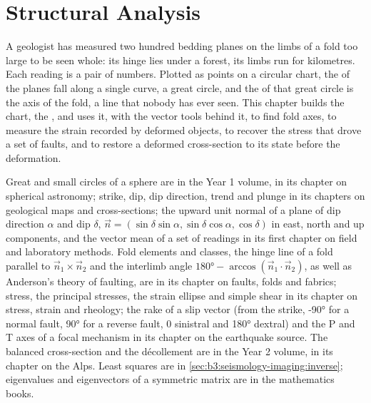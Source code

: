 \chapter{Structural Analysis}\label{ch:b3:structural-analysis}

A geologist has measured two hundred bedding planes on the limbs of a fold
too large to be seen whole: its hinge lies under a forest, its limbs run for
kilometres. Each reading is a pair of numbers. Plotted as points on a circular
chart, the  of the planes fall along a single curve, a great circle, and
the  of that great circle is the axis of the fold, a line that nobody has
ever seen. This chapter builds the chart, the , and
uses it, with the vector tools behind it, to find fold axes, to measure the
strain recorded by deformed objects, to recover the stress that drove a set of
faults, and to restore a deformed cross-section to its state before the
deformation.

\begin{recall}
Great and small circles of a sphere are in the Year 1 volume, in its chapter
on spherical astronomy; strike, dip, dip direction, trend and plunge in its
chapters on geological maps and cross-sections; the upward unit normal of a
plane of dip direction $\alpha$ and dip $\delta$, $\vec n = (\sin\delta
\sin\alpha, \sin\delta\cos\alpha, \cos\delta)$ in east, north and up
components, and the vector mean of a set of readings in its first chapter on
field and laboratory methods. Fold elements and classes, the hinge line of a
fold parallel to $\vec n_1\times\vec n_2$ and the interlimb angle
$\ang{180} - \arccos(\vec n_1\cdot\vec n_2)$, as well as Anderson's theory of
faulting, are in its chapter on faults, folds and fabrics; stress, the
principal stresses, the strain ellipse and simple shear in its chapter on
stress, strain and rheology; the rake of a slip vector (from the strike,
\ang{-90} for a normal fault, \ang{90} for a reverse fault, 0 sinistral and
\ang{180} dextral) and the P and T axes of a focal mechanism in its chapter on
the earthquake source. The balanced cross-section and the décollement are in
the Year 2 volume, in its chapter on the Alps. Least squares are in
\cref{sec:b3:seismology-imaging:inverse}; eigenvalues and eigenvectors of a
symmetric matrix are in the mathematics books.
\end{recall}

